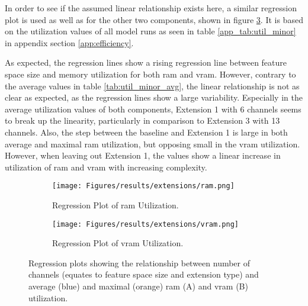 In order to see if the assumed linear relationship exists here, a similar regression plot is used as well as for the other two components, shown in figure \ref{fig:minor_reg}. It is based on the utilization values of all model runs as seen in table \ref{app_tab:util_minor} in appendix section \ref{app:efficiency}.

As expected, the regression lines show a rising regression line between feature space size and memory utilization for both \gls{ram} and \gls{vram}. However, contrary to the average values in table \ref{tab:util_minor_avg}, the linear relationship is not as clear as expected, as the regression lines show a large variability. Especially in the average utilization values of both components, Extension 1 with 6 channels seems to break up the linearity, particularly in comparison to Extension 3 with 13 channels. Also, the step between the baseline and Extension 1 is large in both average and maximal \gls{ram} utilization, but opposing small in the \gls{vram} utilization. However, when leaving out Extension 1, the values show a linear increase in utilization of \gls{ram} and \gls{vram} with increasing complexity.

\begin{figure}[htb]
    \centering
    \begin{subfigure}{.49\textwidth}
        \centering
        \texttt{[image: Figures/results/extensions/ram.png]}
        \caption{Regression Plot of \gls{ram} Utilization.}
        \label{fig:ram_reg}
    \end{subfigure}
    \begin{subfigure}{.49\textwidth}
        \centering
        \texttt{[image: Figures/results/extensions/vram.png]}
        \caption{Regression Plot of \gls{vram} Utilization.}
        \label{fig:vram_reg}
    \end{subfigure}
    \caption[Regression Plots of  \&  Utilization]{Regression plots showing the relationship between number of channels (equates to feature space size and extension type) and average (blue) and maximal (orange) \gls{ram} (A) and \gls{vram} (B) utilization.}
    \label{fig:minor_reg}
\end{figure}

